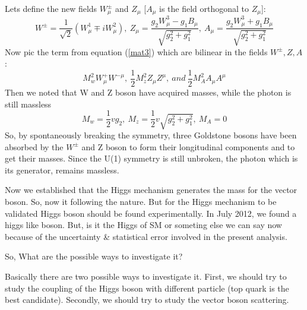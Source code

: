 Lets define the new fields $W^{\pm}_\mu$ and $Z_\mu$ [$A_\mu$ is the field orthogonal to $Z_\mu$]:
\begin{equation}
    W^{\pm}=\frac{1}{\sqrt{2}}(W^1_\mu \mp iW^2_\mu),~Z_\mu=\frac{g_2W^3_\mu-g_1B_\mu}{\sqrt{g^2_2+g^2_1}},~A_\mu=\frac{g_2W^3_\mu+g_1B_\mu}{\sqrt{g^2_2+g^2_1}}
\end{equation}
Now pic the term from equation (\ref{mat3}) which are bilinear in the fields $W^\pm,Z,A$:
    \begin{equation}
    M^2_wW^+_\mu W^{-\mu},~\frac{1}{2}M^2_z Z_\mu Z^\mu,~and~\frac{1}{2}M^2_AA_\mu A^\mu
    \end{equation}
Then we noted that W and Z boson have acquired masses, while the photon is still massless
    \begin{equation}
    M_w=\frac{1}{2}vg_2,~M_z=\frac{1}{2}v\sqrt{g^2_2+g^2_1},~M_A=0
    \end{equation}
So, by spontaneously breaking the symmetry, three Goldstone bosons have been absorbed by the $W^\pm$ and Z boson to form their longitudinal components and to get their masses. Since the U(1) symmetry is still unbroken, the photon which is its generator, remains massless.


Now we established that the Higgs mechanism generates the mass for the vector boson. So, now it following the nature. But for the Higgs mechanism to be validated Higgs boson should be found experimentally. In July 2012, we found a higgs like boson. But, is it the Higgs of SM or someting else we can say now because of the uncertainty \& statistical error involved in the present analysis. 

So, What are the possible ways to investigate it?

Basically there are two possible ways to investigate it. First, we should try to study the coupling of the Higgs boson with different particle (top quark is the best candidate). Secondly, we should try to study the vector boson scattering.
